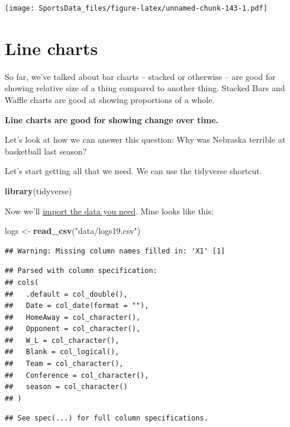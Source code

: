 \documentclass[
]{book}
\newenvironment{Shaded}{\begin{snugshade}}{\end{snugshade}}
\newcommand{\KeywordTok}[1]{\textcolor[rgb]{0.13,0.29,0.53}{\textbf{#1}}}
\newcommand{\NormalTok}[1]{#1}
\newcommand{\StringTok}[1]{\textcolor[rgb]{0.31,0.60,0.02}{#1}}
\begin{document}
\texttt{[image: SportsData\_files/figure-latex/unnamed-chunk-143-1.pdf]}

\hypertarget{line-charts}{%
\chapter{Line charts}\label{line-charts}}

So far, we've talked about bar charts -- stacked or otherwise -- are good for showing relative size of a thing compared to another thing. Stacked Bars and Waffle charts are good at showing proportions of a whole.

\textbf{Line charts are good for showing change over time.}

Let's look at how we can answer this question: Why was Nebraska terrible at basketball last season?

Let's start getting all that we need. We can use the tidyverse shortcut.

\begin{Shaded}
\begin{Highlighting}[]
\KeywordTok{library}\NormalTok{(tidyverse)}
\end{Highlighting}
\end{Shaded}

Now we'll \href{https://unl.box.com/s/fozp95j76gbc08qqoe01ozcxzsz801ns}{import the data you need}. Mine looks like this:

\begin{Shaded}
\begin{Highlighting}[]
\NormalTok{logs <-}\StringTok{ }\KeywordTok{read_csv}\NormalTok{(}\StringTok{"data/logs19.csv"}\NormalTok{)}
\end{Highlighting}
\end{Shaded}

\begin{verbatim}
## Warning: Missing column names filled in: 'X1' [1]
\end{verbatim}

\begin{verbatim}
## Parsed with column specification:
## cols(
##   .default = col_double(),
##   Date = col_date(format = ""),
##   HomeAway = col_character(),
##   Opponent = col_character(),
##   W_L = col_character(),
##   Blank = col_logical(),
##   Team = col_character(),
##   Conference = col_character(),
##   season = col_character()
## )
\end{verbatim}

\begin{verbatim}
## See spec(...) for full column specifications.
\end{verbatim}
\end{document}
